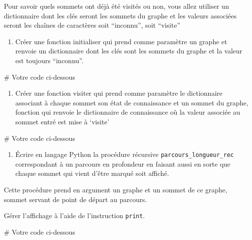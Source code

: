 \documentclass[
  a4paper,
  DIV=11,
  numbers=noendperiod]{scrartcl}
\newenvironment{Shaded}{\begin{snugshade}}{\end{snugshade}}
\newcommand{\CommentTok}[1]{\textcolor[rgb]{0.37,0.37,0.37}{#1}}
\providecommand{\tightlist}{%
  \setlength{\itemsep}{0pt}\setlength{\parskip}{0pt}}\usepackage{longtable,booktabs,array}
\begin{document}
Pour savoir quels sommets ont déjà été visités ou non, vous allez
utiliser un dictionnaire dont les clés seront les sommets du graphe et
les valeurs associées seront les chaînes de caractères soit ``inconnu'',
soit ``visite''

\begin{enumerate}
\def\labelenumi{\arabic{enumi}.}
\tightlist
\item
  Créer une fonction initialiser qui prend comme paramètre un graphe et
  renvoie un dictionnaire dont les clés sont les sommets du graphe et la
  valeur est toujours ``inconnu''.
\end{enumerate}

\begin{Shaded}
\begin{Highlighting}[]
\CommentTok{\# Votre code ci{-}dessous}
\end{Highlighting}
\end{Shaded}

\begin{enumerate}
\def\labelenumi{\arabic{enumi}.}
\setcounter{enumi}{1}
\tightlist
\item
  Créer une fonction visiter qui prend comme paramètre le dictionnaire
  associant à chaque sommet son état de connaissance et un sommet du
  graphe, fonction qui renvoie le dictionnaire de connaissance où la
  valeur associée au sommet entré est mise à `visite'
\end{enumerate}

\begin{Shaded}
\begin{Highlighting}[]
\CommentTok{\# Votre code ci{-}dessous}
\end{Highlighting}
\end{Shaded}

\begin{enumerate}
\def\labelenumi{\arabic{enumi}.}
\setcounter{enumi}{2}
\tightlist
\item
  Écrire en langage Python la procédure récursive
  \texttt{parcours\_longueur\_rec} correspondant à un parcours en
  profondeur en faisant aussi en sorte que chaque sommet qui vient
  d'être marqué soit affiché.
\end{enumerate}

Cette procédure prend en argument un graphe et un sommet de ce graphe,
sommet servant de point de départ au parcours.

Gérer l'affichage à l'aide de l'instruction \texttt{print}.

\begin{Shaded}
\begin{Highlighting}[]
\CommentTok{\# Votre code ci{-}dessous}
\end{Highlighting}
\end{Shaded}
\end{document}
